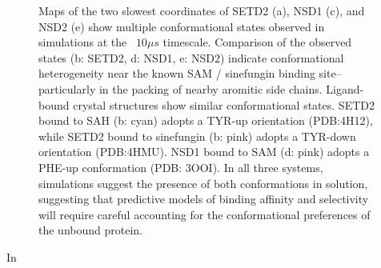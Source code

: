 \documentclass[12pt]{article}
\begin{document}
\begin{figure}

\caption{
Maps of the two slowest coordinates of SETD2 (a), NSD1 (c), and NSD2 (e) show multiple conformational states observed in simulations at the ~$10 \mu s$ timescale.  Comparison of the observed states (b: SETD2, d: NSD1, e: NSD2) indicate conformational heterogeneity near the known SAM / sinefungin binding site--particularly in the packing of nearby aromitic side chains.  Ligand-bound crystal structures show similar conformational states.  SETD2 bound to SAH (b: cyan) adopts a TYR-up orientation (PDB:4H12), while SETD2 bound to sinefungin (b: pink) adopts a TYR-down orientation (PDB:4HMU).  NSD1 bound to SAM (d: pink) adopts a PHE-up conformation (PDB: 3OOI).  In all three systems, simulations suggest the presence of both conformations in solution, suggesting that predictive models of binding affinity and selectivity will require careful accounting for the conformational preferences of the unbound protein.
}
\label{figure:MSM}
\end{figure}



In 
\end{document}
